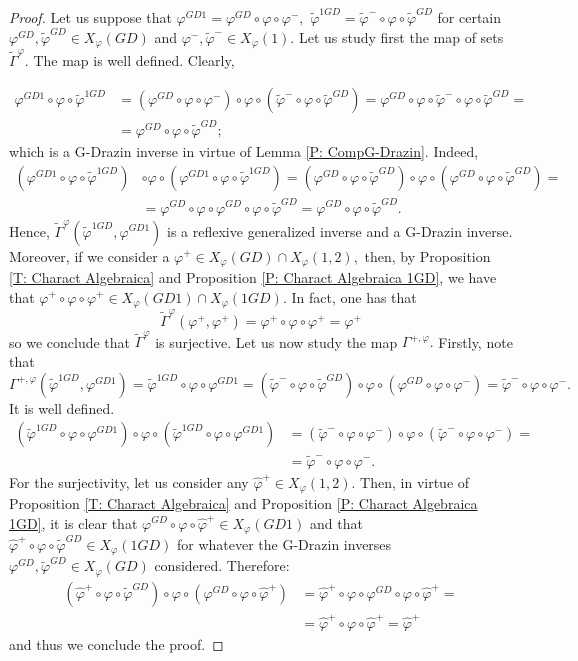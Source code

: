 \documentclass[10pt,a4paper]{amsart}
\theoremstyle{plain}
\theoremstyle{remark}
\numberwithin{equation}{section} \numberwithin{defn}{section}
\newcommand{\f}{\varphi}
\begin{document}
\begin{proof}
Let us suppose that $\f^{GD1}=\f^{GD}\circ \f \circ \f^{-},$  $\tilde{\f}^{1GD}=\tilde{\f}^-\circ \f \circ \tilde{\f}^{GD}$ for certain $\f^{GD}, \tilde{\f}^{GD}\in X_{\f}(GD)$ and $\f^-,\tilde{\f}^-\in X_{\f}(1).$ Let us study first the map of sets $\tilde{\Gamma}^{\f}.$ The map is well defined. Clearly, 

\begin{align*}
\f^{GD1}\circ \f \circ \tilde{\f}^{1GD}& =(\f^{GD}\circ \f \circ \f^{-})\circ \f \circ (\tilde{\f}^-\circ \f \circ \tilde{\f}^{GD})=\f^{GD}\circ \f \circ \tilde{\f}^-\circ \f \circ \tilde{\f}^{GD}=\\ & =\f^{GD}\circ \f \circ \tilde{\f}^{GD};
\end{align*} 
which is a G-Drazin inverse in virtue of Lemma \ref{P: CompG-Drazin}. Indeed, 
\begin{align*}
(\f^{GD1} \circ \f \circ \tilde{\f}^{1GD})& \circ \f \circ (\f^{GD1}\circ \f \circ \tilde{\f}^{1GD})=(\f^{GD}\circ \f \circ \tilde{\f}^{GD})\circ \f \circ (\f^{GD}\circ \f \circ \tilde{\f}^{GD})= \\ & =\f^{GD}\circ \f \circ \f^{GD}\circ \f\circ \tilde{\f}^{GD}=\f^{GD}\circ \f \circ \tilde{\f}^{GD}.
\end{align*}
Hence, $\tilde{\Gamma}^{\f}(\tilde{\f}^{1GD},\f^{GD1})$ is a reflexive generalized inverse and a G-Drazin inverse. Moreover, if we consider a $\f^+\in X_{\f}(GD)\cap X_{\f}(1,2),$ then, by Proposition \ref{T: Charact Algebraica} and Proposition \ref{P: Charact Algebraica 1GD}, we have that $\f^+\circ \f \circ \f^+ \in X_{\f}(GD1)\cap X_{\f}(1GD).$ In fact, one has that $$\tilde{\Gamma}^{\f}(\f^+,\f^+)=\f^+\circ \f \circ \f^+=\f^+ $$
so we conclude that $\tilde{\Gamma}^{\f}$ is surjective. Let us now study the map $\Gamma^{+,\f}.$ Firstly, note that $$\Gamma^{+,\f}(\tilde{\f}^{1GD},\f^{GD1})=\tilde{\f}^{1GD}\circ \f \circ \f^{GD1}=(\tilde{\f}^-\circ \f\circ \tilde{\f}^{GD})\circ \f \circ (\f^{GD}\circ \f \circ \f^-)=\tilde{\f}^-\circ \f \circ \f^-. $$ It is well defined. \begin{align*}
(\tilde{\f}^{1GD}\circ \f \circ \f^{GD1})\circ \f \circ (\tilde{\f}^{1GD}\circ \f \circ \f^{GD1})& = (\tilde{\f}^-\circ \f \circ \f^-)\circ \f \circ (\tilde{\f}^-\circ \f \circ \f^-)=\\ &=\tilde{\f}^-\circ \f \circ \f^-.
\end{align*}
For the surjectivity, let us consider any $\hat{\f}^+\in X_{\f}(1,2).$ Then, in virtue of Proposition \ref{T: Charact Algebraica} and Proposition \ref{P: Charact Algebraica 1GD}, it is clear that $\f^{GD}\circ \f \circ \hat{\f}^{+}\in X_{\f}(GD1)$ and that $\hat{\f}^+\circ \f \circ \tilde{\f}^{GD}\in X_{\f}(1GD)$ for whatever the G-Drazin inverses $\f^{GD},\tilde{\f}^{GD}\in X_{\f}(GD)$ considered. Therefore: \begin{align*}
(\hat{\f}^+\circ \f \circ \tilde{\f}^{GD})\circ \f \circ (\f^{GD}\circ \f \circ \hat{\f}^{+})& = \hat{\f}^+\circ \f \circ \f^{GD}\circ \f \circ \hat{\f}^{+}= \\& =\hat{\f}^+\circ \f\circ \hat{\f}^+=\hat{\f}^+
\end{align*}
and thus we conclude the proof.
\end{proof}
\end{document}

